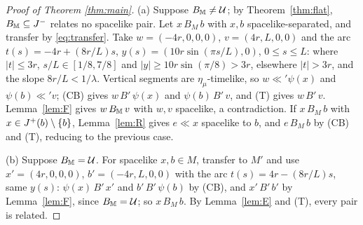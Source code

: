 \begin{proof}[Proof of Theorem \ref{thm:main}]
(a) Suppose $B_\mathbb M\neq\mathcal U$; by Theorem~\ref{thm:flat}, $B_\mathbb M\subseteq J^{-}$
relates no spacelike pair. Let $x\,B_M\,b$ with $x,b$ spacelike-separated, and
transfer by \eqref{eq:transfer}. Take $w=(-4r,0,0,0)$, $v=(4r,L,0,0)$ and the arc
$t(s)=-4r+(8r/L)s$, $y(s)=(10r\sin(\pi s/L),0)$, $0\le s\le L$: where $|t|\le3r$,
$s/L\in[1/8,7/8]$ and $|y|\ge10r\sin(\pi/8)>3r$, elsewhere $|t|>3r$, and the
slope $8r/L<1/\lambda$. Vertical segments are $\eta_\mu$-timelike, so
$w\ll'\psi(x)$ and $\psi(b)\ll'v$; (CB) gives $w\,B'\,\psi(x)$ and
$\psi(b)\,B'\,v$, and (T) gives $w\,B'\,v$. Lemma~\ref{lem:F} gives $w\,B_\mathbb M\,v$
with $w,v$ spacelike, a contradiction. If $x\,B_M\,b$ with
$x\in J^{+}(b)\setminus\{b\}$, Lemma~\ref{lem:R} gives $e\ll x$ spacelike to $b$, and
$e\,B_M\,b$ by (CB) and (T), reducing to the previous case.

(b) Suppose $B_\mathbb M=\mathcal U$. For spacelike $x,b\in M$, transfer to $M'$ and use
$x'=(4r,0,0,0)$, $b'=(-4r,L,0,0)$ with the arc $t(s)=4r-(8r/L)s$, same $y(s)$:
$\psi(x)\,B'\,x'$ and $b'\,B'\,\psi(b)$ by (CB), and $x'\,B'\,b'$ by
Lemma~\ref{lem:F}, since $B_\mathbb M=\mathcal U$; so $x\,B_M\,b$. By Lemma~\ref{lem:E} and
(T), every pair is related.
\end{proof}

